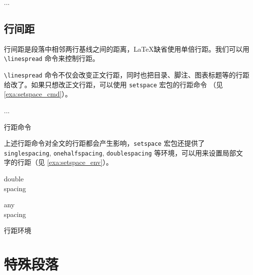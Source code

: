 \begin{Code}[]
\usepackage{identfirst}
...
\setlength{\parindent}{2em}
\addtolength{\parskip}{3pt}
\end{Code}

\subsection{行间距}
行间距是段落中相邻两行基线之间的距离，\LaTeX 缺省使用单倍行距。我们可以用 \verb|\linespread| 命令来控制行距。

\begin{Code}[]
\linespread{1.3} %
\linespread{1.6} %
\end{Code}

\verb|\linespread| 命令不仅会改变正文行距，同时也把目录、脚注、图表标题等的行距给改了。如果只想改正文行距，可以使用 \texttt{setspace} 宏包的行距命令 （见 \autoref{exa:setspace_cmd}）。

\begin{example}[h]
\begin{Code}[]
\usepackage{setspace}
...
\singlespacing    %
\onehalfspacing   %
\doublespacing    %
\end{Code}
\caption{行距命令}
\label{exa:setspace_cmd}
\end{example}

上述行距命令对全文的行距都会产生影响，\texttt{setspace} 宏包还提供了 \texttt{singlespacing}, \texttt{onehalfspacing}, \texttt{doublespacing} 等环境，可以用来设置局部文字的行距（见 \autoref{exa:setspace_env}）。

\begin{example}[h]
\begin{RLDemo}[]
\begin{doublespacing}
double\\spacing
\end{doublespacing}
\end{RLDemo}
\begin{RLDemo}[]
\begin{spacing}{1.25}
any\\spacing
\end{spacing}
\end{RLDemo}
\caption{行距环境}
\label{exa:setspace_env}
\end{example}

\section{特殊段落}
